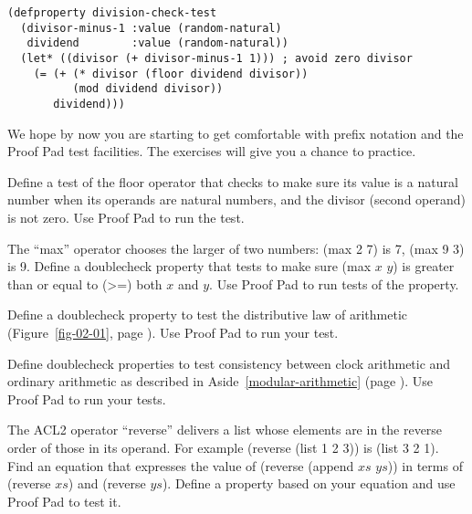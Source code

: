 \label{division-check-test}
\begin{Verbatim}
(defproperty division-check-test
  (divisor-minus-1 :value (random-natural)
   dividend        :value (random-natural))
  (let* ((divisor (+ divisor-minus-1 1))) ; avoid zero divisor
    (= (+ (* divisor (floor dividend divisor))
          (mod dividend divisor))
       dividend)))
\end{Verbatim}

We hope by now you are starting to get comfortable with prefix notation
and the Proof Pad test facilities.
The exercises will give you a chance to practice.

\begin{ExerciseList}
\Exercise Define a test of the floor operator
that checks to make sure its value is a natural number
when its operands are natural numbers,
and the divisor (second operand) is not zero.
Use Proof Pad to run the test.

\Exercise The ``max'' operator chooses the larger of two numbers:
(max 2 7) is 7, (max 9 3) is 9.
Define a doublecheck property that tests to make sure
(max $x$ $y$) is greater than or equal to (>=) both $x$ and $y$.
Use Proof Pad to run tests of the property.

\Exercise
Define a doublecheck property to test the distributive law
of arithmetic (Figure~\ref{fig-02-01}, page \pageref{fig-02-01}).
Use Proof Pad to run your test.

\Exercise
Define doublecheck properties to test
consistency between clock
arithmetic and ordinary arithmetic
as described in 
Aside~\ref{modular-arithmetic} (page \pageref{modular-arithmetic}).
Use Proof Pad to run your tests.

\Exercise
The ACL2 operator ``reverse'' delivers a list whose
elements are in the reverse order of those in its operand.
For example (reverse (list 1 2 3)) is (list 3 2 1).
Find an equation that expresses the value of (reverse (append $xs$ $ys$))
in terms of (reverse $xs$) and (reverse $ys$).
Define a property based on your equation and
use Proof Pad to test it.

\end{ExerciseList}

